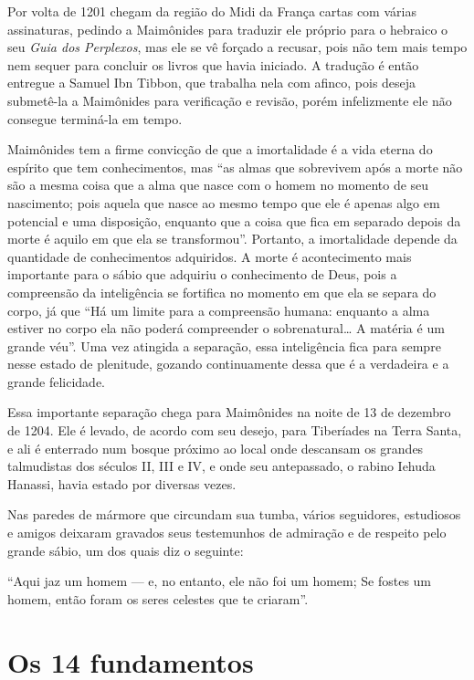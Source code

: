 Por volta de 1201 chegam da região do Midi da França cartas com várias
assinaturas, pedindo a Maimônides para traduzir ele próprio para o
hebraico o seu \emph{Guia dos Perplexos}, mas ele se vê forçado a
recusar, pois não tem mais tempo nem sequer para concluir os livros que
havia iniciado. A tradução é então entregue a Samuel Ibn Tibbon, que
trabalha nela com afinco, pois deseja submetê-la a Maimônides para
verificação e revisão, porém infelizmente ele não consegue terminá-la em
tempo.

Maimônides tem a firme convicção de que a imortalidade é a vida eterna
do espírito que tem conhecimentos, mas ``as almas que sobrevivem após a
morte não são a mesma coisa que a alma que nasce com o homem no momento
de seu nascimento; pois aquela que nasce ao mesmo tempo que ele é apenas
algo em potencial e uma disposição, enquanto que a coisa que fica em
separado depois da morte é aquilo em que ela se transformou''. Portanto,
a imortalidade depende da quantidade de conhecimentos adquiridos. A
morte é acontecimento mais importante para o sábio que adquiriu o
conhecimento de Deus, pois a compreensão da inteligência se fortifica no
momento em que ela se separa do corpo, já que ``Há um limite para a
compreensão humana: enquanto a alma estiver no corpo ela não poderá
compreender o sobrenatural\ldots{} A matéria é um grande véu''. Uma vez
atingida a separação, essa inteligência fica para sempre nesse estado
de plenitude, gozando continuamente dessa que é a verdadeira e a grande
felicidade.

Essa importante separação chega para Maimônides na noite
de 13 de dezembro de 1204. Ele é levado, de acordo
com seu desejo, para Tiberíades na Terra Santa, e ali é enterrado num
bosque próximo ao local onde descansam os grandes talmudistas dos
séculos II, III e IV, e onde seu antepassado, o rabino Iehuda Hanassi,
havia estado por diversas vezes.

Nas paredes de mármore que circundam sua tumba, vários seguidores,
estudiosos e amigos deixaram gravados seus testemunhos de admiração e de
respeito pelo grande sábio, um dos quais diz o seguinte:

``Aqui jaz um homem --- e, no entanto, ele não foi um homem; Se fostes
um homem, então foram os seres celestes que te criaram''.


\chapter{Os 14 fundamentos} 

